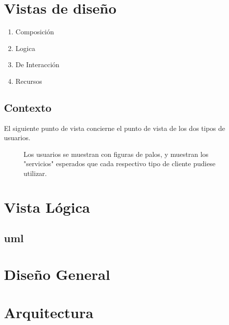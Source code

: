 \documentclass{article}
\begin{document}
  \section{Vistas de dise\~no}

  \begin{enumerate}
      \item Composici\'on 
      \item Logica
      \item De Interacci\'on
      \item Recursos
  \end{enumerate}


\subsection{Contexto}
  El siguiente punto de vista concierne el punto de vista de los dos tipos de usuarios.

  \begin{figure}[!htb]
    \begin{center}
      
    \end{center}
    \caption{Los usuarios se muestran con figuras de palos, y muestran los "servicios" esperados que cada respectivo tipo de cliente pudiese utilizar.}\label{fig:}
  \end{figure}
  

\section{Vista L\'ogica}
\subsection{uml}

\begin{figure}[!htb]
  \begin{center}
    \scalebox{1.0 }{
      
    }
  \end{center}
  \caption{}\label{fig:}
\end{figure}


\section{Dise\~no General}
  
\section{Arquitectura}
\end{document}
